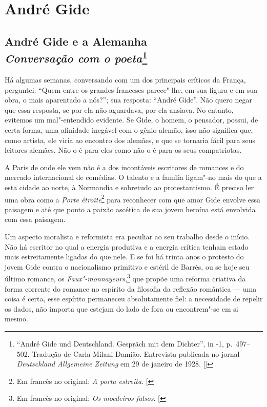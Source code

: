 \movetooddpage
{}
\part*{André Gide}

\chapter*{André Gide e a Alemanha\\
\emph{Conversação com o poeta}\footnote[*]{``André Gide und Deutschland. Gespräch mit dem Dichter'', in -1, p.~497--502. Tradução de Carla Milani Damião. Entrevista publicada no jornal \emph{Deutschland Allgemeine Zeitung} em 29 de janeiro de 1928. []}}


Há algumas semanas, conversando com um dos principais críticos da
França, perguntei: ``Quem entre os grandes franceses parece"-lhe, em sua
figura e em sua obra, o mais aparentado a nós?''; sua resposta:
``André Gide''. Não quero negar que essa resposta, se por ela não
aguardava, por ela ansiava. No entanto, evitemos um mal"-entendido
evidente. Se Gide, o homem, o pensador, possui, de certa forma, uma
afinidade inegável com o gênio alemão, isso não significa que, como
artista, ele viria ao encontro dos alemães, e que se tornaria fácil para
seus leitores alemães. Não o é para eles como não o é para os seus
compatriotas.

A Paris de onde ele vem não é a dos incontáveis ​​escritores de romances
e do mercado internacional de comédias. O talento e a família ligam"-no
mais do que a esta cidade ao norte, à Normandia e sobretudo ao
protestantismo. É preciso ler uma obra como a \emph{Porte étroite}\footnote{Em francês no original: \emph{A porta estreita}. {[}\versal{N.~T.}{]}} para
reconhecer com que amor Gide envolve essa paisagem e até que ponto a
paixão ascética de sua jovem heroína está envolvida com essa paisagem.

Um aspecto moralista e reformista era peculiar ao seu trabalho desde o
início. Não há escritor no qual a energia produtiva e a energia crítica
tenham estado mais estreitamente ligadas do que nele. E se foi há trinta
anos o protesto do jovem Gide contra o nacionalismo primitivo e estéril
de Barrès, ou se hoje seu último romance, os \emph{Faux"-monnayeurs},\footnote{Em francês no original: \emph{Os moedeiros falsos}. {[}\versal{N.~T.}{]}}
que propõe uma reforma criativa da forma corrente do romance no
espírito da filosofia da reflexão romântica --- uma coisa é certa, esse
espírito permaneceu absolutamente fiel: a necessidade de repelir os
dados, não importa que estejam do lado de fora ou encontrem"-se em si
mesmo.

